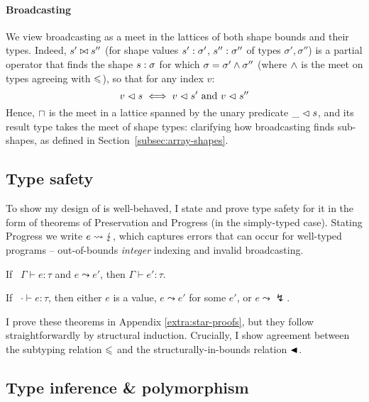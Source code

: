 \paragraph{Broadcasting}
We view broadcasting as a meet in the lattices of both shape bounds and their types. 
Indeed, $s' \bowtie s''$ (for shape values $s': \sigma'$, $s'' : \sigma''$ of types $\sigma', \sigma''$) is a partial operator that finds the shape $s : \sigma$ for which $\sigma = \sigma' \land \sigma''$ (where $\land$ is the meet on types agreeing with $\leqslant$), so that for any index $v$: 
$$ v \vartriangleleft s \iff v \vartriangleleft s' \text{ and } v \vartriangleleft s'' $$
Hence, $\sqcap$ is the meet in a lattice spanned by the unary predicate $\_ \vartriangleleft s$, and its result type takes the meet of shape types: clarifying how broadcasting finds sub-shapes, as defined in Section~\ref{subsec:array-shapes}.

\subsection{Type safety}
\label{subsec:type-safety}

To show my design of \starr{} is well-behaved, I state and prove type safety for it in the form of theorems of Preservation and Progress (in the simply-typed case). Stating Progress we write $e \leadsto \lightning$, which captures errors that can occur for well-typed programs -- out-of-bounds \emph{integer} indexing and invalid broadcasting.

\begin{theorem}[Preservation]
    If \ $\Gamma \vdash e : \tau$ and $e \leadsto e'$, then $\Gamma \vdash e' : \tau$.
\end{theorem}
\begin{theorem}[Progress]
    If \ $\cdot \vdash e : \tau$, then either $e$ is a value, $e \leadsto e'$ for some $e'$, or $e \leadsto \lightning$.
\end{theorem}

I prove these theorems in Appendix \ref{extra:star-proofs}, but they follow straightforwardly by structural induction. Crucially, I show agreement between the subtyping relation $\leqslant$ and the structurally-in-bounds relation $\blacktriangleleft$.

\needspace{4em}
\subsection{Type inference \& polymorphism}
\label{subsec:type-inference}

